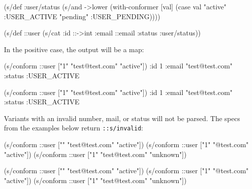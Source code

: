 \begin{english}
  \begin{clojure}
(s/def :user/status
  (s/and ->lower
         (with-conformer [val]
           (case val
             "active"  :USER_ACTIVE
             "pending" :USER_PENDING))))

(s/def ::user
  (s/cat :id ::->int
         :email ::email
         :status :user/status))
  \end{clojure}
\end{english}

\noindent
In the positive case, the output will be a map:

\ifx\DEVICETYPE\MOBILE

\begin{english}
  \begin{clojure}
(s/conform ::user
  ["1" "test@test.com" "active"])
{:id 1
 :email "test@test.com"
 :status :USER_ACTIVE}
  \end{clojure}
\end{english}

\else

\begin{english}
  \begin{clojure}
(s/conform ::user ["1" "test@test.com" "active"])
{:id 1
 :email "test@test.com"
 :status :USER_ACTIVE}
  \end{clojure}
\end{english}

\fi

Variants with an invalid number, mail, or status will not be parsed. The specs from the examples below return \verb|::s/invalid|:

\ifx\DEVICETYPE\MOBILE

\begin{english}
  \begin{clojure}
(s/conform ::user
  ["" "test@test.com" "active"])
(s/conform ::user
  ["1" "@test.com" "active"])
(s/conform ::user
  ["1" "test@test.com" "unknown"])
  \end{clojure}
\end{english}

\else

\begin{english}
 \begin{clojure}
(s/conform ::user ["" "test@test.com" "active"])
(s/conform ::user ["1" "@test.com" "active"])
(s/conform ::user ["1" "test@test.com" "unknown"])
  \end{clojure}
\end{english}

